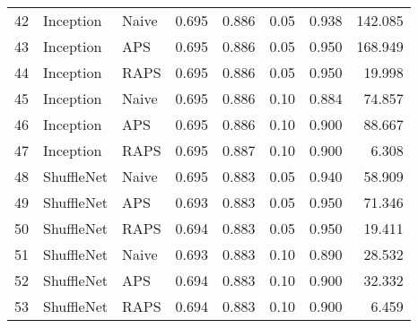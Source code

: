 \begin{tabular}{lllrrrrr}
42 &    Inception &     Naive &  0.695 &  0.886 &   0.05 &     0.938 &  142.085 \\
43 &    Inception &       APS &  0.695 &  0.886 &   0.05 &     0.950 &  168.949 \\
44 &    Inception &      RAPS &  0.695 &  0.886 &   0.05 &     0.950 &   19.998 \\
45 &    Inception &     Naive &  0.695 &  0.886 &   0.10 &     0.884 &   74.857 \\
46 &    Inception &       APS &  0.695 &  0.886 &   0.10 &     0.900 &   88.667 \\
47 &    Inception &      RAPS &  0.695 &  0.887 &   0.10 &     0.900 &    6.308 \\
48 &   ShuffleNet &     Naive &  0.695 &  0.883 &   0.05 &     0.940 &   58.909 \\
49 &   ShuffleNet &       APS &  0.693 &  0.883 &   0.05 &     0.950 &   71.346 \\
50 &   ShuffleNet &      RAPS &  0.694 &  0.883 &   0.05 &     0.950 &   19.411 \\
51 &   ShuffleNet &     Naive &  0.693 &  0.883 &   0.10 &     0.890 &   28.532 \\
52 &   ShuffleNet &       APS &  0.694 &  0.883 &   0.10 &     0.900 &   32.332 \\
53 &   ShuffleNet &      RAPS &  0.694 &  0.883 &   0.10 &     0.900 &    6.459 \\
\bottomrule
\end{tabular}
